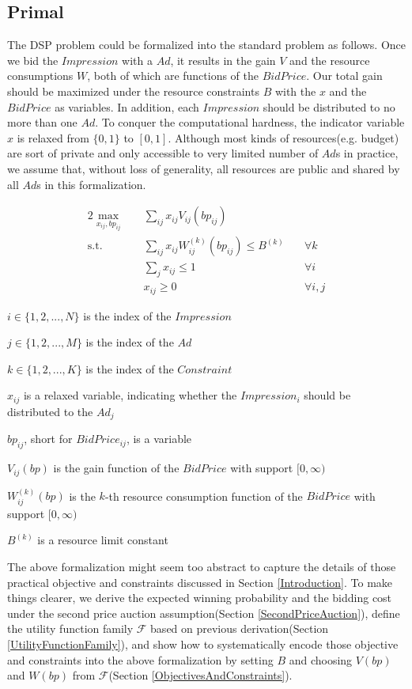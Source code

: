 \documentclass{article}
\newcommand{\sumj}{\sum\limits_j}
\newcommand{\sumij}{\sum\limits_{ij}}
\newcommand{\sx}{x_{ij}}
\newcommand{\sbp}{bp_{ij}}
\newcommand{\sV}{V_{ij}}
\newcommand{\sW}{W_{ij}^{(k)}}
\newcommand{\sB}{B^{(k)}}
\newcommand{\inRange}[1]{\in\{1,2,...,#1\}}
\newcommand{\uff}{\mathscr{F}}
\newcommand{\dspresourceconstraint}{\sumij \sx \sW(\sbp) \le \sB}
\newcommand{\assignmentconstraint}{\sumj \sx \le 1}
\begin{document}
\subsection{Primal} \label{Primal}

The DSP problem could be formalized into the standard problem as follows.
Once we bid the $Impression$ with a $Ad$, it results in the gain $V$ and the resource consumptions $W$, both of which are functions of the $BidPrice$.
Our total gain should be maximized under the resource constraints $B$ with the $x$ and the $BidPrice$ as variables.
In addition, each $Impression$ should be distributed to no more than one $Ad$.
To conquer the computational hardness, the indicator variable $x$ is relaxed from $\{0, 1\}$ to $[0, 1]$.
Although most kinds of resources(e.g. budget) are sort of private and only accessible to very limited number of $Ad$s in practice,
    we assume that, without loss of generality, all resources are public and shared by all $Ad$s in this formalization.

\begin{alignat}{2}
    \max\limits_{\sx, \sbp} \quad & \sumij \sx \sV(\sbp) \quad    & {} \\
    \mbox{s.t.} \quad             & \dspresourceconstraint \quad  & \forall k \\
    \quad                         & \assignmentconstraint \quad   & \forall i \\
    \quad                         & \sx \ge 0 \quad               & \forall i,j
\end{alignat}

$i \inRange{N}$ is the index of the $Impression$

$j \inRange{M}$ is the index of the $Ad$

$k \inRange{K}$ is the index of the $Constraint$

$\sx$ is a relaxed variable, indicating whether the $Impression_i$ should be distributed to the $Ad_j$

$\sbp$, short for $BidPrice_{ij}$, is a variable

$\sV(bp)$ is the gain function of the $BidPrice$ with support $[0, \infty)$

$\sW(bp)$ is the $k$-th resource consumption function of the $BidPrice$ with support $[0, \infty)$

$\sB$ is a resource limit constant

The above formalization might seem too abstract to capture the details of
    those practical objective and constraints discussed in Section \ref{Introduction}.
To make things clearer, we
    derive the expected winning probability and the bidding cost
        under the second price auction assumption(Section \ref{SecondPriceAuction}),
    define the utility function family $\uff$ based on previous derivation(Section \ref{UtilityFunctionFamily}),
    and show how to systematically encode those objective and constraints into the above formalization
        by setting $B$ and choosing $V(bp)$ and $W(bp)$ from $\uff$(Section \ref{ObjectivesAndConstraints}).
\end{document}
